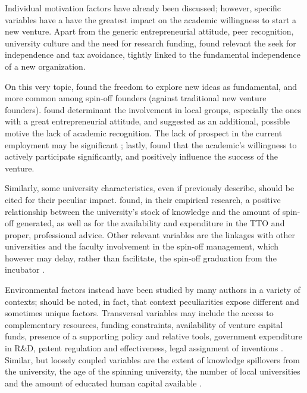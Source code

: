 Individual motivation factors have already been discussed; however, specific variables have a have the greatest impact on the academic willingness to start a new venture. Apart from the generic entrepreneurial attitude, peer recognition, university culture and the need for research funding, \citet{Rizzo2015} found relevant the seek for independence and tax avoidance, tightly linked to the fundamental independence of a new organization. 

On this very topic, \citet{Perez2003} found the freedom to explore new ideas as fundamental, and more common among spin-off founders (against traditional new venture founders). \citet{Siegel2007} found determinant the involvement in local groups, especially the ones with a great entrepreneurial attitude, and suggested as an additional, possible motive the lack of academic recognition. The lack of prospect in the current employment may be significant \citep{Rizzo2015}; lastly, \citet{Ittelson2002} found that the academic's willingness to actively participate significantly, and positively influence the success of the venture.

Similarly,  some university characteristics, even if previously describe, should be cited for their peculiar impact. \citet{Lockett2005a} found, in their empirical research, a positive relationship between the university's stock of knowledge and the amount of spin-off generated, as well as for the availability and expenditure in the TTO and proper, professional advice. Other relevant variables are the linkages with other universities and the faculty involvement in the spin-off management, which however may delay, rather than facilitate, the spin-off graduation from the incubator \citep{Rothaermel2005}.

Environmental factors instead have been studied by many authors in a variety of contexts; should be noted, in fact, that context peculiarities expose different and sometimes unique factors. Transversal variables may include the access to complementary resources, funding constraints, availability of venture capital funds, presence of a supporting policy and relative tools, government expenditure in R\&D, patent regulation and effectiveness, legal assignment of inventions \citep{OShea2004, Fini2009, Rizzo2015}. Similar, but loosely coupled variables are the extent of knowledge spillovers from the university, the age of the spinning university, the number of local universities and the amount of educated human capital available \citep{Audretsch2005}.

